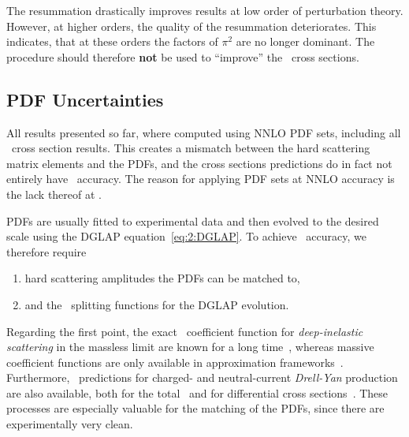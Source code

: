 The resummation drastically improves results at low order of perturbation theory. However, at higher orders, the quality of the resummation deteriorates. This indicates, that at these orders the factors of $\pi^2$ are no longer dominant. The procedure should therefore \textbf{not} be used to ``improve'' the \NNNLO\ cross sections.

\subsection{PDF Uncertainties} \label{subsec:4:pdf_uncertainties}
All results presented so far, where computed using \acs{NNLO} \acs{PDF} sets, including all \NNNLO\ cross section results. This creates a mismatch between the hard scattering matrix elements and the \acs{PDF}s, and the cross sections predictions do in fact not entirely have \NNNLO\ accuracy. The reason for applying \acs{PDF} sets at \acs{NNLO} accuracy is the lack thereof at \NNNLO.

\acs{PDF}s are usually fitted to experimental data and then evolved to the desired scale using the DGLAP equation~\eqref{eq:2:DGLAP}. To achieve \NNNLO\ accuracy, we therefore require
\begin{enumerate}
  \item hard scattering amplitudes the \acs{PDF}s can be matched to,
  \item and the \NNNLO\ splitting functions for the DGLAP evolution.
\end{enumerate}
Regarding the first point, the exact \NNNLO\ coefficient function for \textit{deep-inelastic scattering} in the massless limit are known for a long time~\cite{Vermaseren:2005qc, Moch:2004xu, Moch:2007rq, Moch:2008fj, Davies:2016ruz, Blumlein:2022gpp}, whereas massive coefficient functions are only available in approximation frameworks~\cite{Kawamura:2012cr, Laurenti:2024anf}. Furthermore, \NNNLO\ predictions for charged- and neutral-current \textit{Drell-Yan} production are also available, both for the total~\cite{Baglio:2022wzu, Duhr:2020sdp, Duhr:2021vwj} and for differential cross sections~\cite{Chen:2021vtu, Chen:2022lwc}. These processes are especially valuable for the matching of the \acs{PDF}s, since there are experimentally very clean.

